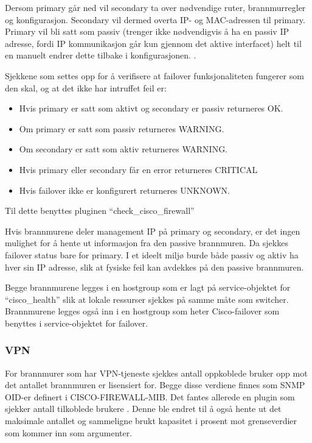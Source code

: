 Dersom primary går ned vil secondary ta over nødvendige ruter, brannmurregler og konfigurasjon. Secondary vil dermed overta IP- og MAC-adressen til primary. Primary vil bli satt som passiv (trenger ikke nødvendigvis å ha en passiv IP adresse, fordi IP kommunikasjon går kun gjennom det aktive interfacet) helt til en manuelt endrer dette tilbake i konfigurasjonen. \cite{ciscofailover}. 

Sjekkene som settes opp for å verifisere at failover funksjonaliteten fungerer som den skal, og at det ikke har intruffet feil er:
\begin{itemize}
\item Hvis primary er satt som aktivt og secondary er passiv returneres OK.
\item Om primary er satt som passiv returneres WARNING. 
\item Om secondary er satt som aktiv returneres WARNING.
\item Hvis primary eller secondary får en error returneres CRITICAL
\item Hvis failover ikke er konfigurert returneres UNKNOWN. 
\end{itemize}

Til dette benyttes pluginen “check\_cisco\_firewall” 

Hvis brannmurene deler management IP på primary og secondary, er det ingen mulighet for å hente ut informasjon fra den passive brannmuren. Da sjekkes failover status bare for primary. I et ideelt miljø burde både passiv og aktiv ha hver sin IP adresse, slik at fysiske feil kan avdekkes på den passive brannmuren.

Begge brannmurene legges i en hostgroup som er lagt på service-objektet for “cisco\_health” slik at lokale ressurser sjekkes på samme måte som switcher. Brannmurene legges også inn i en hostgroup som heter Cisco-failover som benyttes i service-objektet for failover.

\subsubsection{VPN}

For brannmurer som har VPN-tjeneste sjekkes antall oppkoblede bruker opp mot det antallet brannmuren er lisensiert for. Begge disse verdiene finnes som SNMP OID-er definert i CISCO-FIREWALL-MIB. Det fantes allerede en plugin som sjekker antall tilkoblede brukere . Denne ble endret til å også hente ut det maksimale antallet og sammeligne brukt kapasitet i prosent mot grenseverdier som kommer inn som argumenter.

